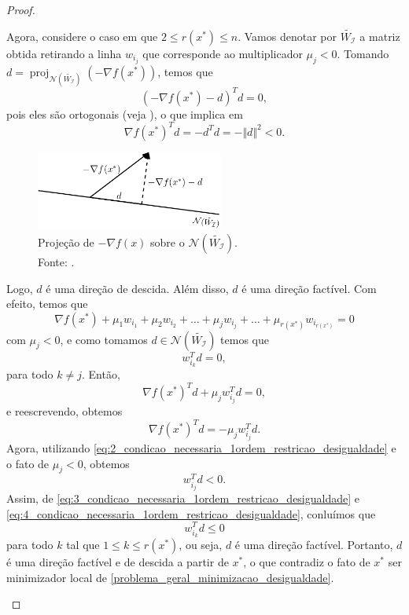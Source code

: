 \documentclass[12pt,a4paper]{scrartcl}
\DeclareMathOperator{\proj}{proj}
\theoremstyle{definition}%
\begin{document}
\begin{proof}
\begin{enumerate}
Agora, considere o caso em que $2\leq r(x^{*}) \leq n$. Vamos denotar por $\tilde{W_{\mathcal{I}}}$ a matriz obtida retirando a linha $w_{i_{j}}$ que corresponde ao multiplicador $\mu_{j} <0$. Tomando $d=\proj_{\mathcal{N}(\tilde{W_{\mathcal{I}}})} (-\nabla f(x^{*}))$, temos que
\[
(-\nabla f(x^{*}) -d)^{T}d =0,
\]
pois eles são ortogonais (veja ), o que implica em
\[ \label{eq:2_condicao_necessaria_1ordem_restricao_desigualdade}
\nabla f(x^{*})^{T}d = -d^{T}d = -\Vert d \Vert^{2} <0.
\]
\begin{figure}[!ht] 
	\centering
	\includegraphics[width=0.55\textwidth]{projecao_gradiente_sobre_nucleoW}
	\caption{Projeção de $-\nabla f(x)$ sobre o $\mathcal{N}(\tilde{W_{\mathcal{I}}})$. \\ Fonte: \textcite{Ana1994}. \label{fig:projecao_gradiente_sobre_nucleoA}}
\end{figure}
Logo, $d$ é uma direção de descida. Além disso, $d$ é uma direção factível. Com efeito, temos que
\[
\nabla f(x^{*}) + \mu_{1} w_{i_{1}} + \mu_{2} w_{i_{2}} + \ldots + \mu_{j} w_{i_{j}} + \ldots + \mu_{r(x^{*})} w_{i_{r(x^{*})}} =0
\]
com $\mu_{j} <0$, e como tomamos $d \in \mathcal{N}(\tilde{W_{\mathcal{I}}})$ temos que
\[ \label{eq:3_condicao_necessaria_1ordem_restricao_desigualdade}
w_{i_{k}}^{T}d =0, 
\]
para todo $k \neq j$. Então,
\[
\nabla f(x^{*})^{T}d + \mu_{j} w_{i_{j}}^{T} d =0,
\]
e reescrevendo, obtemos
\[
\nabla f(x^{*})^{T}d = -\mu_{j} w_{i_{j}}^{T} d.
\]
Agora, utilizando \eqref{eq:2_condicao_necessaria_1ordem_restricao_desigualdade} e o fato de $\mu_{j} <0$, obtemos
\[ \label{eq:4_condicao_necessaria_1ordem_restricao_desigualdade}
w_{i_{j}}^{T} d <0.
\]
Assim, de \eqref{eq:3_condicao_necessaria_1ordem_restricao_desigualdade} e \eqref{eq:4_condicao_necessaria_1ordem_restricao_desigualdade}, conluímos que
\[
w_{i_{k}}^{T} d \leq 0
\]
para todo $k$ tal que $1 \leq k \leq r(x^{*})$, ou seja, $d$ é uma direção factível. Portanto, $d$ é uma direção factível e de descida a partir de $x^{*}$, o que contradiz o fato de $x^{*}$ ser minimizador local de \eqref{problema_geral_minimizacao_desigualdade}.
\end{enumerate}
\end{proof}
\end{document}
